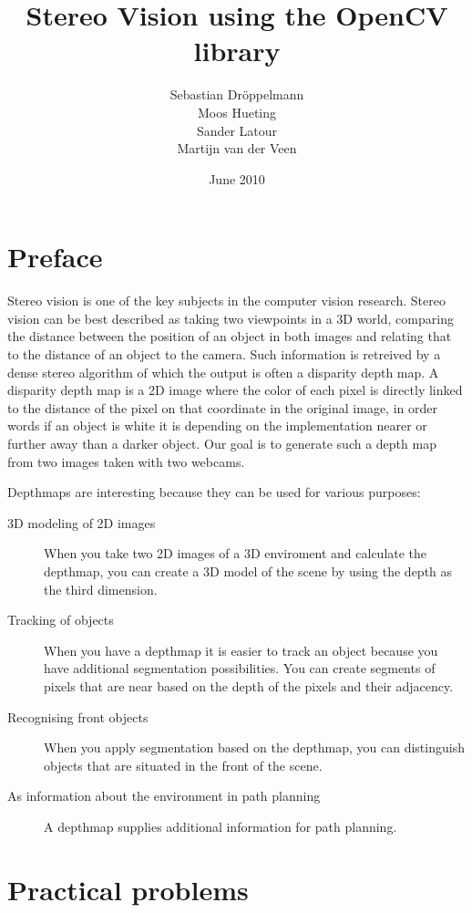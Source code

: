 \documentclass[a4paper]{article}
\title{Stereo Vision using the OpenCV library}
\author{Sebastian Dr\"oppelmann \\ Moos Hueting \\ Sander Latour \\ Martijn van der Veen}
\date{June 2010}
\begin{document}
\begin{titlepage}
  \maketitle
\end{titlepage}

\section{Preface}
Stereo vision is one of the key subjects in the computer vision research. Stereo vision can be best described as taking two viewpoints in a 3D world, comparing the distance between the position of an object in both images and relating that to the distance of an object to the camera. Such information is retreived by a dense stereo algorithm of which the output is often a disparity depth map. A disparity depth map is a 2D image where the color of each pixel is directly linked to the distance of the pixel on that coordinate in the original image, in order words if an object is white it is depending on the implementation nearer or further away than a darker object. Our goal is to generate such a depth map from two images taken with two webcams.

Depthmaps are interesting because they can be used for various purposes: 
\begin{description}
 \item[3D modeling of 2D images] When you take two 2D images of a 3D enviroment and calculate the depthmap, you can create a 3D model of the scene by using the depth as the third dimension.
 \item[Tracking of objects] When you have a depthmap it is easier to track an object because you have additional segmentation possibilities. You can create segments of pixels that are near based on the depth of the pixels and their adjacency.
 \item[Recognising front objects] When you apply segmentation based on the depthmap, you can distinguish objects that are situated in the front of the scene.
 \item[As information about the environment in path planning] A depthmap supplies additional information for path planning.
\end{description}

\section{Practical problems}
\end{document}
